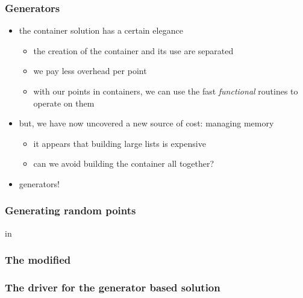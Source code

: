 \begin{frame}[fragile]
%
  \frametitle{Generators}
%
  \begin{itemize}
%
  \item the container solution has a certain elegance
    \begin{itemize}
    \item the creation of the container and its use are separated
    \item we pay less overhead per point
    \item with our points in containers, we can use the fast \emph{functional} routines to
      operate on them
    \end{itemize}
%
  \item but, we have now uncovered a new source of cost: managing memory
    \begin{itemize}
    \item it appears that building large lists is expensive
    \item can we avoid building the container all together?
    \end{itemize}
%
  \item generators!
%
  \end{itemize}
%
\end{frame}

\begin{frame}[fragile]
%
  \frametitle{Generating random points}
%
  in 
%
%
\end{frame}

\begin{frame}[fragile]
%
  \frametitle{The modified }
%
%
\end{frame}

\begin{frame}[fragile]
%
  \frametitle{The driver for the generator based solution}
%
%
\end{frame}

